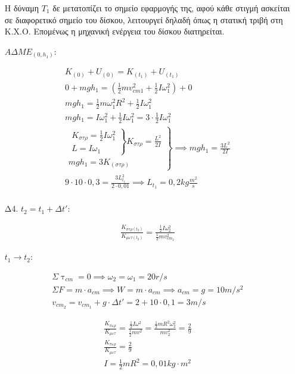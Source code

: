 \documentclass[12pt]{article}
\begin{document}
\begin{enumerate}
    Η δύναμη $T_1$ δε μετατοπίζει το σημείο εφαρμογής της, αφού κάθε στιγμή ασκείται σε διαφορετικό σημείο του δίσκου, λειτουργεί δηλαδή όπως η στατική τριβή στη Κ.Χ.Ο. Επομένως η μηχανική ενέργεια του δίσκου διατηρείται.

    $ΑΔΜΕ_{(0,h_1)}:$

    \begin{gather*}
      K_{(0)}+U_{(0)}=K_{(t_1)}+U_{(t_1)} \\      0+mgh_1=\left( \frac{1}{2}mv_{cm1}^2+\frac{1}{2}Iω_1^2\right) + 0 \\
      mgh_1=\frac{1}{2}mω_1^2R^2+\frac{1}{2}Iω_1^2 \\
      mgh_1=Iω_1^2+\frac{1}{2}Iω_1^2=3\cdot\frac{1}{2}Iω_1^2 \\
      \left. \begin{matrix} \left.
        \begin{matrix}K_{στρ}=\frac{1}{2}Iω_1^2 \\ L=Iω_1
        \end{matrix}
        \right\} K_{στρ}=\frac{L^2}{2I} \\
        mgh_1=3K_{(στρ)}
      \end{matrix}
      \right\}
      \implies mgh_1=\frac{3L^2}{2I} \\
      9\cdot 10\cdot 0,3=\frac{3L_{t_1}^2}{2\cdot 0,01}
      \implies L_{t_1}=0,2kg \frac{m^2}{s} \\
    \end{gather*}

    \item [Δ4.]
    $t_2=t_1+Δt'$:

    \begin{gather*}
      \frac{K_{στρ(t_2)}}{K_{μετ(t_2)}}=\frac{\frac{1}{2}Iω_2^2}{\frac{1}{2}mv_{cm_2}^2}
    \end{gather*}

    $t_1\to t_2$:

    \begin{gather*}
      Σ\uptau_{cm}=0\implies ω_2=ω_1=20r/s \\
      ΣF=m\cdot a_{cm}\implies W=m\cdot a_{cm}\implies a_{cm}=g=10 m/s^2 \\
      v_{cm_2}=v_{cm_1}+g\cdot Δt'=2+10\cdot 0,1=3m/s
    \end{gather*}

    \begin{gather*}
      \frac{K_{περ}}{K_{μετ}}=\frac{\frac{1}{2}Iω^2}{\frac{1}{2}mv^2}=\frac{\frac{1}{2}mR^2ω_2^2}{mv_2^2}=\frac{2}{9} \\
      \frac{K_{περ}}{K_{μετ}}=\frac{2}{9} \\
      I=\frac{1}{2}mR^2=0,01kg\cdot m^2
    \end{gather*}

  \end{enumerate}
\end{document}
